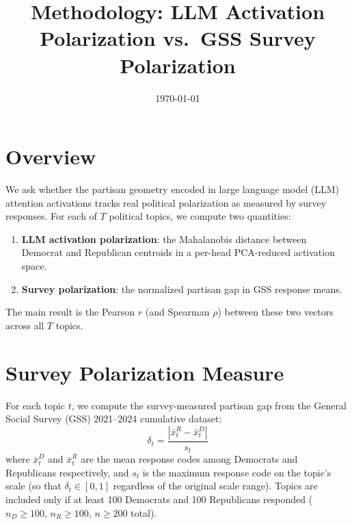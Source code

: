 \documentclass[12pt]{article}
\title{Methodology: LLM Activation Polarization vs.\ GSS Survey Polarization}
\date{\today}
\begin{document}
\maketitle
\tableofcontents
\newpage

\section{Overview}

We ask whether the partisan geometry encoded in large language model (LLM) attention activations tracks real political polarization as measured by survey responses. For each of $T$ political topics, we compute two quantities:

\begin{enumerate}
    \item \textbf{LLM activation polarization}: the Mahalanobis distance between Democrat and Republican centroids in a per-head PCA-reduced activation space.
    \item \textbf{Survey polarization}: the normalized partisan gap in GSS response means.
\end{enumerate}

The main result is the Pearson $r$ (and Spearman $\rho$) between these two vectors across all $T$ topics.

\section{Survey Polarization Measure}
\label{sec:gss}

For each topic $t$, we compute the survey-measured partisan gap from the General Social Survey (GSS) 2021--2024 cumulative dataset:
\begin{equation}
    \delta_t = \frac{|\bar{x}^R_t - \bar{x}^D_t|}{s_t}
\end{equation}
where $\bar{x}^D_t$ and $\bar{x}^R_t$ are the mean response codes among Democrats and Republicans respectively, and $s_t$ is the maximum response code on the topic's scale (so that $\delta_t \in [0,1]$ regardless of the original scale range). Topics are included only if at least 100 Democrats and 100 Republicans responded ($n_D \geq 100$, $n_R \geq 100$, $n \geq 200$ total).
\end{document}

